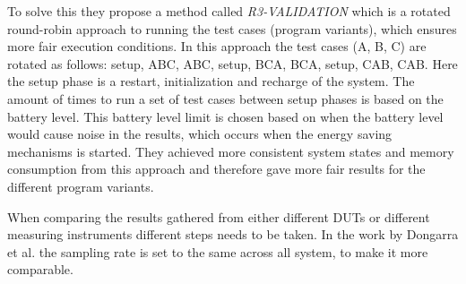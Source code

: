 To solve this they propose a method called \textit{R3-VALIDATION}\cite{Bokhari2020r3} which is a rotated round-robin approach to running the test cases (program variants), which ensures more fair execution conditions. In this approach the test cases (A, B, C) are rotated as follows: setup, ABC, ABC, setup, BCA, BCA, setup, CAB, CAB. Here the setup phase is a restart, initialization and recharge of the system. The amount of times to run a set of test cases between setup phases is based on the battery level. This battery level limit is chosen based on when the battery level would cause noise in the results, which occurs when the energy saving mechanisms is started. They achieved more consistent system states and memory consumption from this approach and therefore gave more fair results for the different program variants.\cite{Bokhari2020r3}\nytafsnit

When comparing the results gathered from either different DUTs or different measuring instruments different steps needs to be taken. In the work by Dongarra et al.\cite[]{Dongarra2012} the sampling rate is set to the same across all system, to make it more comparable.